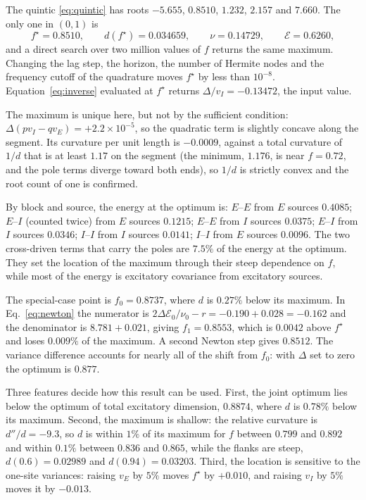 \documentclass[11pt]{article}
\newcommand{\energy}{\mathcal E}
\begin{document}
The quintic \eqref{eq:quintic} has roots $-5.655$, $0.8510$, $1.232$, $2.157$ and $7.660$. The only one in $(0,1)$ is
\[
 f^\star=0.8510,\qquad d(f^\star)=0.034659,\qquad \nu=0.14729,\qquad \energy=0.6260,
\]
and a direct search over two million values of $f$ returns the same maximum. Changing the lag step, the horizon, the number of Hermite nodes and the frequency cutoff of the quadrature moves $f^\star$ by less than $10^{-8}$. Equation~\eqref{eq:inverse} evaluated at $f^\star$ returns $\Delta/v_I=-0.13472$, the input value.

The maximum is unique here, but not by the sufficient condition: $\Delta(pv_I-qv_E)=+2.2\times10^{-5}$, so the quadratic term is slightly concave along the segment. Its curvature per unit length is $-0.0009$, against a total curvature of $1/d$ that is at least $1.17$ on the segment (the minimum, $1.176$, is near $f=0.72$, and the pole terms diverge toward both ends), so $1/d$ is strictly convex and the root count of one is confirmed.

By block and source, the energy at the optimum is: $E$--$E$ from $E$ sources $0.4085$; $E$--$I$ (counted twice) from $E$ sources $0.1215$; $E$--$E$ from $I$ sources $0.0375$; $E$--$I$ from $I$ sources $0.0346$; $I$--$I$ from $I$ sources $0.0141$; $I$--$I$ from $E$ sources $0.0096$. The two cross-driven terms that carry the poles are $7.5\%$ of the energy at the optimum. They set the location of the maximum through their steep dependence on $f$, while most of the energy is excitatory covariance from excitatory sources.

The special-case point is $f_0=0.8737$, where $d$ is $0.27\%$ below its maximum. In Eq.~\eqref{eq:newton} the numerator is $2\Delta\energy_0/\nu_0-r=-0.190+0.028=-0.162$ and the denominator is $8.781+0.021$, giving $f_1=0.8553$, which is $0.0042$ above $f^\star$ and loses $0.009\%$ of the maximum. A second Newton step gives $0.8512$. The variance difference accounts for nearly all of the shift from $f_0$: with $\Delta$ set to zero the optimum is $0.877$.

Three features decide how this result can be used. First, the joint optimum lies below the optimum of total excitatory dimension, $0.8874$, where $d$ is $0.78\%$ below its maximum. Second, the maximum is shallow: the relative curvature is $d''/d=-9.3$, so $d$ is within $1\%$ of its maximum for $f$ between $0.799$ and $0.892$ and within $0.1\%$ between $0.836$ and $0.865$, while the flanks are steep, $d(0.6)=0.02989$ and $d(0.94)=0.03203$. Third, the location is sensitive to the one-site variances: raising $v_E$ by $5\%$ moves $f^\star$ by $+0.010$, and raising $v_I$ by $5\%$ moves it by $-0.013$.
\end{document}

